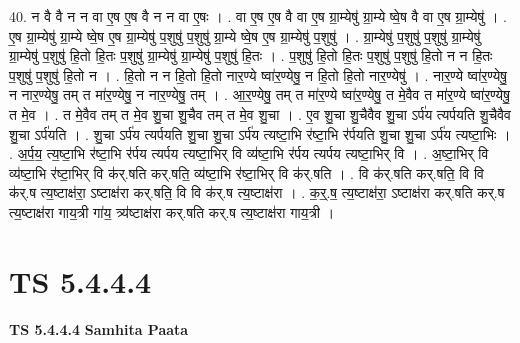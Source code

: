 \documentclass[17pt]{extarticle}
\begin{document}
40. न वै वै न न वा ए॒ष ए॒ष वै न न वा ए॒षः । . वा ए॒ष ए॒ष वै वा ए॒ष ग्रा॒म्येषु॑ ग्रा॒म्ये ष्वे॒ष वै वा ए॒ष ग्रा॒म्येषु॑ । . ए॒ष ग्रा॒म्येषु॑ ग्रा॒म्ये ष्वे॒ष ए॒ष ग्रा॒म्येषु॑ प॒शुषु॑ प॒शुषु॑ ग्रा॒म्ये ष्वे॒ष ए॒ष ग्रा॒म्येषु॑ प॒शुषु॑ । . ग्रा॒म्येषु॑ प॒शुषु॑ प॒शुषु॑ ग्रा॒म्येषु॑ ग्रा॒म्येषु॑ प॒शुषु॑ हि॒तो हि॒तः प॒शुषु॑ ग्रा॒म्येषु॑ ग्रा॒म्येषु॑ प॒शुषु॑ हि॒तः । . प॒शुषु॑ हि॒तो हि॒तः प॒शुषु॑ प॒शुषु॑ हि॒तो न न हि॒तः प॒शुषु॑ प॒शुषु॑ हि॒तो न । . हि॒तो न न हि॒तो हि॒तो नार॒ण्ये ष्वा॑र॒ण्येषु॒ न हि॒तो हि॒तो नार॒ण्येषु॑ । . नार॒ण्ये ष्वा॑र॒ण्येषु॒ न नार॒ण्येषु॒ तम् त मा॑र॒ण्येषु॒ न नार॒ण्येषु॒ तम् । . आ॒र॒ण्येषु॒ तम् त मा॑र॒ण्ये ष्वा॑र॒ण्येषु॒ त मे॒वैव त मा॑र॒ण्ये ष्वा॑र॒ण्येषु॒ त मे॒व । . त मे॒वैव तम् त मे॒व शु॒चा शु॒चैव तम् त मे॒व शु॒चा । . ए॒व शु॒चा शु॒चैवैव शु॒चा ऽर्प॑य त्यर्पयति शु॒चैवैव शु॒चा ऽर्प॑यति । . शु॒चा ऽर्प॑य त्यर्पयति शु॒चा शु॒चा ऽर्प॑य त्यष्टा॒भि र॑ष्टा॒भि र॑र्पयति शु॒चा शु॒चा ऽर्प॑य त्यष्टा॒भिः । . अ॒र्प॒य॒ त्य॒ष्टा॒भि र॑ष्टा॒भि र॑र्पय त्यर्पय त्यष्टा॒भिर् वि व्य॑ष्टा॒भि र॑र्पय त्यर्पय त्यष्टा॒भिर् वि । . अ॒ष्टा॒भिर् वि व्य॑ष्टा॒भि र॑ष्टा॒भिर् वि क॑र्.षति कर्.षति॒ व्य॑ष्टा॒भि र॑ष्टा॒भिर् वि क॑र्.षति । . वि क॑र्.षति कर्.षति॒ वि वि क॑र्.ष त्य॒ष्टाक्ष॑रा॒ ऽष्टाक्ष॑रा कर्.षति॒ वि वि क॑र्.ष त्य॒ष्टाक्ष॑रा । . क॒र्॒.ष॒ त्य॒ष्टाक्ष॑रा॒ ऽष्टाक्ष॑रा कर्.षति कर्.ष त्य॒ष्टाक्ष॑रा गाय॒त्री गा॑य॒ त्र्य॑ष्टाक्ष॑रा कर्.षति कर्.ष त्य॒ष्टाक्ष॑रा गाय॒त्री । \newline
\pagebreak
{}

\section{ TS 5.4.4.4 }

\textbf{TS 5.4.4.4 } \newline
\textbf{Samhita Paata} \newline
\end{document}
